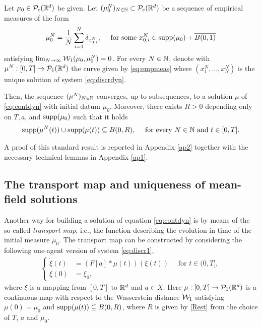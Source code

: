 \begin{proposition}\label{pr:exist}
Let $\mu_0 \in \mathcal{P}_c(\mathbb{R}^d)$ be given. Let $(\mu^{N}_0)_{N \in \mathbb{N}} \subset \mathcal{P}_c(\mathbb{R}^d)$ be a sequence of empirical measures of the form
\begin{align*}
\mu^{N}_0 = \frac{1}{N}\sum^N_{i = 1} \delta_{x^{N}_{0,i}}, \quad \text{ for some } x^{N}_{0,i} \in \operatorname{supp}(\mu_0) + \overline{B(0,1)}
\end{align*}
satisfying $\lim_{N \rightarrow \infty} \mathcal{W}_1(\mu_0,\mu^{N}_0) = 0$. For every $N \in \mathbb{N}$, denote with $\mu^N:[0,T] \rightarrow \mathcal{P}_1(\mathbb{R}^{d})$ the curve given by \eqref{eq:empmeas} where $(x^N_1,\ldots,x^N_N)$ is the unique solution of system \eqref{eq:discrdyn}.

Then, the sequence $(\mu^N)_{N \in \mathbb{N}}$ converges, up to subsequences, to a solution $\mu$ of \eqref{eq:contdyn} with initial datum $\mu_0$. Moreover, there exists $R > 0$ depending only on $T,a$, and $\operatorname{supp}(\mu_0)$ such that it holds
\begin{align*}
\operatorname{supp}(\mu^N(t)) \cup \operatorname{supp}(\mu(t)) \subseteq B(0,R), \quad \text{ for every } N \in \mathbb{N} \text{ and } t \in [0,T].
\end{align*}
\end{proposition}

 A proof of this standard result is reported in Appendix \ref{ap2} together with the necessary technical lemmas in Appendix \ref{ap1}.

\subsection{The transport map and  uniqueness of mean-field solutions}

Another way for building a solution of equation \eqref{eq:contdyn} is by means of the so-called \textit{transport map}, i.e., the function describing the evolution in time of the initial measure $\mu_0$. The transport map can be constructed by considering the following one-agent version of system \eqref{eq:discr1},
\begin{align}\label{eq:transpdyn}
\left\{\begin{aligned}
\dot{\xi}(t) &= (F[a]*\mu(t))(\xi(t)) \quad \text{ for } t \in (0,T],\\
\xi(0) &= \xi_0,
\end{aligned}\right.
\end{align}
where $\xi$ is a mapping from $[0,T]$ to $\mathbb{R}^d$ and $a \in X$. Here $\mu:[0,T]\rightarrow\mathcal{P}_1(\mathbb{R}^d)$ is a continuous map with respect to the Wasserstein distance $\mathcal{W}_1$ satisfying $\mu(0) = \mu_0$ and $\operatorname{supp}(\mu(t)) \subseteq B(0,R)$, where $R$ is given by \eqref{Rest} from the choice of $T$, $a$ and $\mu_0$. 

